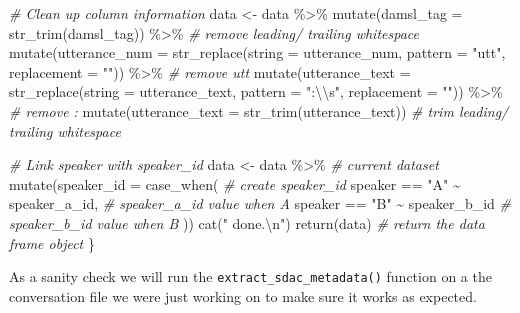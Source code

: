 \documentclass[
]{article}
\newenvironment{Shaded}{\begin{snugshade}}{\end{snugshade}}
\newcommand{\AttributeTok}[1]{\textcolor[rgb]{0.77,0.63,0.00}{#1}}
\newcommand{\CommentTok}[1]{\textcolor[rgb]{0.56,0.35,0.01}{\textit{#1}}}
\newcommand{\FunctionTok}[1]{\textcolor[rgb]{0.00,0.00,0.00}{#1}}
\newcommand{\NormalTok}[1]{#1}
\newcommand{\OtherTok}[1]{\textcolor[rgb]{0.56,0.35,0.01}{#1}}
\newcommand{\SpecialCharTok}[1]{\textcolor[rgb]{0.00,0.00,0.00}{#1}}
\newcommand{\StringTok}[1]{\textcolor[rgb]{0.31,0.60,0.02}{#1}}
\begin{document}
\begin{Shaded}
\begin{Highlighting}[]
  \CommentTok{\# Clean up column information}
\NormalTok{  data }\OtherTok{\textless{}{-}} 
\NormalTok{    data }\SpecialCharTok{\%\textgreater{}\%} 
    \FunctionTok{mutate}\NormalTok{(}\AttributeTok{damsl\_tag =} \FunctionTok{str\_trim}\NormalTok{(damsl\_tag)) }\SpecialCharTok{\%\textgreater{}\%} \CommentTok{\# remove leading/ trailing whitespace}
    \FunctionTok{mutate}\NormalTok{(}\AttributeTok{utterance\_num =} \FunctionTok{str\_replace}\NormalTok{(}\AttributeTok{string =}\NormalTok{ utterance\_num, }\AttributeTok{pattern =} \StringTok{"utt"}\NormalTok{, }\AttributeTok{replacement =} \StringTok{""}\NormalTok{)) }\SpecialCharTok{\%\textgreater{}\%} \CommentTok{\# remove \textquotesingle{}utt\textquotesingle{}}
    \FunctionTok{mutate}\NormalTok{(}\AttributeTok{utterance\_text =} \FunctionTok{str\_replace}\NormalTok{(}\AttributeTok{string =}\NormalTok{ utterance\_text, }\AttributeTok{pattern =} \StringTok{":}\SpecialCharTok{\textbackslash{}\textbackslash{}}\StringTok{s"}\NormalTok{, }\AttributeTok{replacement =} \StringTok{""}\NormalTok{)) }\SpecialCharTok{\%\textgreater{}\%} \CommentTok{\# remove \textquotesingle{}: \textquotesingle{}}
    \FunctionTok{mutate}\NormalTok{(}\AttributeTok{utterance\_text =} \FunctionTok{str\_trim}\NormalTok{(utterance\_text)) }\CommentTok{\# trim leading/ trailing whitespace}
  
  \CommentTok{\# Link speaker with speaker\_id}
\NormalTok{  data }\OtherTok{\textless{}{-}} 
\NormalTok{    data }\SpecialCharTok{\%\textgreater{}\%} \CommentTok{\# current dataset}
    \FunctionTok{mutate}\NormalTok{(}\AttributeTok{speaker\_id =} \FunctionTok{case\_when}\NormalTok{( }\CommentTok{\# create speaker\_id}
\NormalTok{      speaker }\SpecialCharTok{==} \StringTok{"A"} \SpecialCharTok{\textasciitilde{}}\NormalTok{ speaker\_a\_id, }\CommentTok{\# speaker\_a\_id value when A}
\NormalTok{      speaker }\SpecialCharTok{==} \StringTok{"B"} \SpecialCharTok{\textasciitilde{}}\NormalTok{ speaker\_b\_id }\CommentTok{\# speaker\_b\_id value when B}
\NormalTok{    ))}
  \FunctionTok{cat}\NormalTok{(}\StringTok{" done.}\SpecialCharTok{\textbackslash{}n}\StringTok{"}\NormalTok{)}
  \FunctionTok{return}\NormalTok{(data) }\CommentTok{\# return the data frame object}
\NormalTok{\}}
\end{Highlighting}
\end{Shaded}

As a sanity check we will run the \texttt{extract\_sdac\_metadata()} function on a the conversation file we were just working on to make sure it works as expected.
\end{document}
